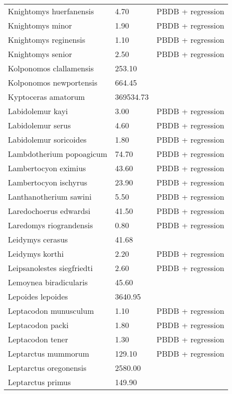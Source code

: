 \documentclass{article}
\begin{document}
\begin{center}
\begin{longtable}{p{} p{} p{}}
    Knightomys huerfanensis & 4.70 & PBDB + regression \\ 
    Knightomys minor & 1.90 & PBDB + regression \\ 
    Knightomys reginensis & 1.10 & PBDB + regression \\ 
    Knightomys senior & 2.50 & PBDB + regression \\ 
    Kolponomos clallamensis & 253.10 & \cite{Tseng2009} \\ 
    Kolponomos newportensis & 664.45 & \cite{Scott2013} \\ 
    Kyptoceras amatorum & 369534.73 & \cite{Tomiya2013} \\ 
    Labidolemur kayi & 3.00 & PBDB + regression \\ 
    Labidolemur serus & 4.60 & PBDB + regression \\ 
    Labidolemur soricoides & 1.80 & PBDB + regression \\ 
    Lambdotherium popoagicum & 74.70 & PBDB + regression \\ 
    Lambertocyon eximius & 43.60 & PBDB + regression \\ 
    Lambertocyon ischyrus & 23.90 & PBDB + regression \\ 
    Lanthanotherium sawini & 5.50 & PBDB + regression \\ 
    Laredochoerus edwardsi & 41.50 & PBDB + regression \\ 
    Laredomys riograndensis & 0.80 & PBDB + regression \\ 
    Leidymys cerasus & 41.68 & \cite{Tomiya2013} \\ 
    Leidymys korthi & 2.20 & PBDB + regression \\ 
    Leipsanolestes siegfriedti & 2.60 & PBDB + regression \\ 
    Lemoynea biradicularis & 45.60 & \cite{Tomiya2013} \\ 
    Lepoides lepoides & 3640.95 & \cite{Tomiya2013} \\ 
    Leptacodon munusculum & 1.10 & PBDB + regression \\ 
    Leptacodon packi & 1.80 & PBDB + regression \\ 
    Leptacodon tener & 1.30 & PBDB + regression \\ 
    Leptarctus mummorum & 129.10 & PBDB + regression \\ 
    Leptarctus oregonensis & 2580.00 & \cite{McKenna2011} \\ 
    Leptarctus primus & 149.90 & \cite{Tomiya2013} \\ 

\end{longtable}
\end{center}
\end{document}
